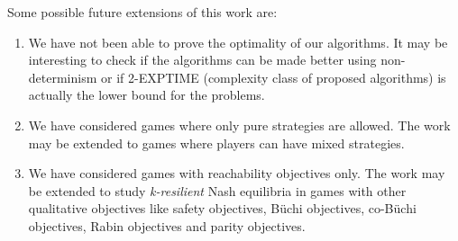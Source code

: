 Some possible future extensions of this work are:
\begin{enumerate}
\item We have not been able to prove the optimality of our algorithms. It may be interesting to check if the algorithms can be made better using non-determinism or if 2-EXPTIME (complexity class of proposed algorithms) is actually the lower bound for the problems.
\item We have considered games where only pure strategies are allowed. The work may be extended to games where players can have mixed strategies.
\item We have considered games with reachability objectives only. The work may be extended to study \textit{k-resilient} Nash equilibria in games with other qualitative objectives like safety objectives, B{\"u}chi objectives, co-B{\"u}chi objectives, Rabin objectives and parity objectives. 
\end{enumerate}